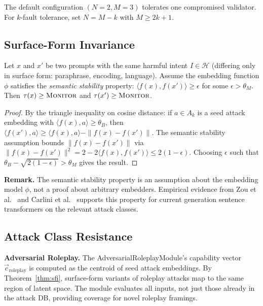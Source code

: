 \documentclass[sigconf,natbib=false]{acmart}
\begin{document}
\begin{corollary}
The default configuration $(N=2, M=3)$ tolerates one compromised validator.
For $k$-fault tolerance, set $N = M - k$ with $M \geq 2k + 1$.
\end{corollary}

\subsection{Surface-Form Invariance}
\label{sec:security:sfi}

\begin{theorem}
\label{thm:sfi}
Let $x$ and $x'$ be two prompts with the same harmful intent
$I \in \mathcal{H}$ (differing only in surface form: paraphrase,
encoding, language). Assume the embedding function $\phi$ satisfies
the \emph{semantic stability} property:
$\langle f(x), f(x') \rangle \geq \epsilon$ for some $\epsilon > \theta_M$.
Then $\tau(x) \geq \textsc{Monitor}$ and $\tau(x') \geq \textsc{Monitor}$.
\end{theorem}

\begin{proof}
By the triangle inequality on cosine distance: if $a \in A_k$ is a seed
attack embedding with $\langle f(x), a \rangle \geq \theta_B$, then
$\langle f(x'), a \rangle \geq \langle f(x), a \rangle - \|f(x) - f(x')\|$.
The semantic stability assumption bounds $\|f(x) - f(x')\|$ via
$\|f(x) - f(x')\|^2 = 2 - 2\langle f(x), f(x')\rangle \leq 2(1-\epsilon)$.
Choosing $\epsilon$ such that $\theta_B - \sqrt{2(1-\epsilon)} > \theta_M$
gives the result.
\end{proof}

\textbf{Remark.} The semantic stability property is an assumption about
the embedding model $\phi$, not a proof about arbitrary embedders.
Empirical evidence from Zou et al.~\cite{zou2023universal} and
Carlini et al.~\cite{carlini2023aligned} supports this property for
current generation sentence transformers on the relevant attack classes.

\subsection{Attack Class Resistance}
\label{sec:security:resistance}

\textbf{Adversarial Roleplay.}
The AdversarialRoleplayModule's capability vector $\vec{c}_{\text{roleplay}}$
is computed as the centroid of seed attack embeddings. By Theorem~\ref{thm:sfi},
surface-form variants of roleplay attacks map to the same region of latent
space. The module evaluates all inputs, not just those already in the
attack DB, providing coverage for novel roleplay framings.
\end{document}
